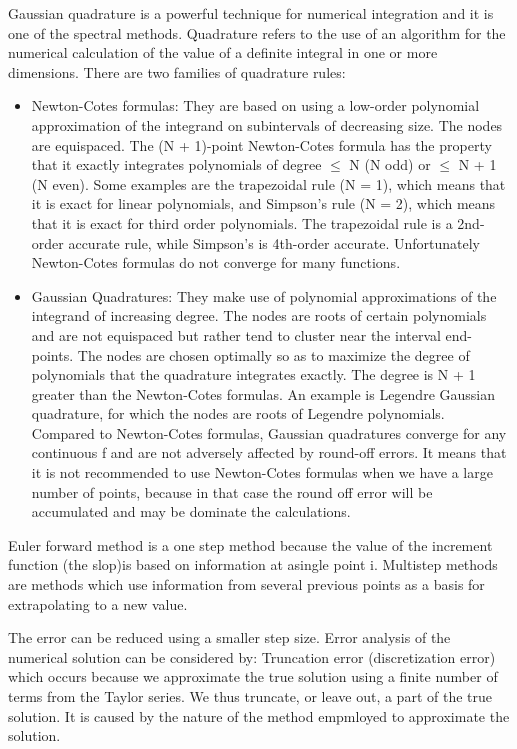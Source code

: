 \documentclass[a4paper,10pt,twoside]{article}
\begin{document}
Gaussian quadrature is a powerful technique for numerical integration and it is one of the spectral methods.
Quadrature refers to the use of an algorithm for the numerical calculation of
the value of a definite integral in one or more dimensions.
There are two families of quadrature rules:
\begin{itemize}
    \item Newton-Cotes formulas: They are based on using a low-order polynomial approximation of the
integrand on subintervals of decreasing size. The nodes are equispaced.
The (N + 1)-point Newton-Cotes formula has the property that it
exactly integrates polynomials of degree $\leq$ N (N odd) or $\leq$ N + 1 (N even). Some examples are the trapezoidal rule (N = 1), which means that it is exact for linear polynomials, and Simpson’s rule (N = 2), which means that it is exact for third order polynomials. The trapezoidal rule is a 2nd-order accurate rule, while Simpson’s is 4th-order accurate. 
Unfortunately Newton-Cotes formulas do not converge for many functions.  
    \item Gaussian Quadratures: They make use of polynomial approximations
of the integrand of increasing degree. The nodes are roots of certain polynomials and are not
equispaced but rather tend to cluster near the interval end-points. The nodes are chosen optimally
so as to maximize the degree of polynomials that the quadrature integrates exactly. The degree is N + 1 greater
than the Newton-Cotes formulas. An example is Legendre Gaussian
quadrature, for which the nodes are roots of Legendre
polynomials. Compared to Newton-Cotes formulas, Gaussian quadratures converge for any continuous f and are not adversely
affected by round-off errors. It means that it is not recommended to use Newton-Cotes formulas when we have a large number of points, because in that case the round off error will be accumulated and may be dominate the calculations.  
\end{itemize}

Euler forward method is a one step method because the value of the increment function (the slop)is based on information at asingle point i. Multistep methods are methods which use information from several previous points as a basis for extrapolating to a new value.

The error can be reduced using a smaller step size. Error analysis of the numerical solution can be considered by: Truncation error (discretization error) which occurs because we approximate the true solution using a finite number of terms from the Taylor series. We thus truncate, or leave out, a part of the true solution. It is caused by the nature of the method empmloyed to approximate the solution. 
\end{document}
